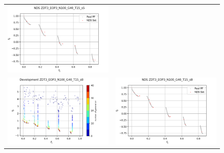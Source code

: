 \begin{figure}[H]
\begin{tabular}{c c}
    \includegraphics[scale=0.5]{figures/ZDT3_EOP3_N100_G40_T15/s5_nds.png}\\
    \includegraphics[scale=0.5]{figures/ZDT3_EOP3_N100_G40_T15/s8_dev.png} &
    \includegraphics[scale=0.5]{figures/ZDT3_EOP3_N100_G40_T15/s8_nds.png}\\

\end{tabular}
\end{figure}

